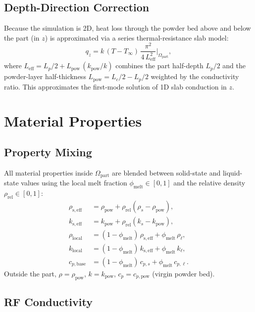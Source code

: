 \documentclass[11pt, letterpaper]{article}
\newcommand{\rhorel}{\rho_{\mathrm{rel}}}
\newcommand{\phimelt}{\phi_{\mathrm{melt}}}
\newcommand{\partmask}{\Omega_{\mathrm{part}}}
\begin{document}
\subsection{Depth-Direction Correction}
\label{sec:depth}

Because the simulation is 2D, heat loss through the powder bed above and below
the part (in $z$) is approximated via a series thermal-resistance slab model:
%
\begin{equation}
  q_z = k\,(T-T_\infty)\,\frac{\pi^2}{4\,L_{\mathrm{eff}}^2}
  \bigg|_{\partmask},
\end{equation}
%
where
$L_{\mathrm{eff}} = L_p/2 + L_{\mathrm{pow}}\,(k_{\mathrm{pow}}/k)$
combines the part half-depth $L_p/2$ and the powder-layer half-thickness
$L_{\mathrm{pow}}=L_c/2-L_p/2$ weighted by the conductivity ratio.
This approximates the first-mode solution of 1D slab conduction in $z$.

\section{Material Properties}

\subsection{Property Mixing}

All material properties inside $\partmask$ are blended between solid-state and
liquid-state values using the local melt fraction $\phimelt\in[0,1]$ and the
relative density $\rhorel\in[0,1]$:
%
\begin{align}
  \rho_{\mathrm{s,eff}} &= \rho_{\mathrm{pow}} + \rhorel(\rho_s - \rho_{\mathrm{pow}}),\\
  k_{\mathrm{s,eff}}    &= k_{\mathrm{pow}}   + \rhorel(k_s   - k_{\mathrm{pow}}),\\
  \rho_{\mathrm{local}} &= (1-\phimelt)\,\rho_{\mathrm{s,eff}} + \phimelt\,\rho_\ell,\\
  k_{\mathrm{local}}    &= (1-\phimelt)\,k_{\mathrm{s,eff}}   + \phimelt\,k_\ell,\\
  c_{p,\mathrm{base}}   &= (1-\phimelt)\,c_{p,s}              + \phimelt\,c_{p,\ell}.
\end{align}
%
Outside the part, $\rho=\rho_{\mathrm{pow}}$, $k=k_{\mathrm{pow}}$,
$c_p=c_{p,\mathrm{pow}}$ (virgin powder bed).

\subsection{RF Conductivity}
\end{document}
